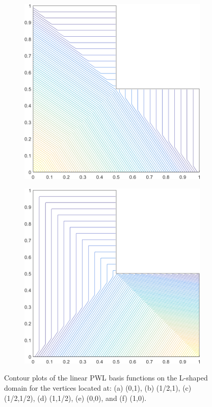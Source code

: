 \begin{figure}
\begin{subfigure}[b]{0.39\textwidth}
		\caption{}
	\end{subfigure}
	\vfill
	\begin{subfigure}[b]{0.39\textwidth}
		\centering
		\includegraphics[width=\textwidth]{figures/sec_BF/L-domain_PWLD1_contour_b1.png}
		\caption{}
	\end{subfigure}
	\hspace{1.5cm}
	\begin{subfigure}[b]{0.39\textwidth}
		\centering
		\includegraphics[width=\textwidth]{figures/sec_BF/L-domain_PWLD1_contour_b2.png}
		\caption{}
	\end{subfigure}
\caption{Contour plots of the linear PWL basis functions on the L-shaped domain for the vertices located at: (a) (0,1), (b) (1/2,1), (c) (1/2,1/2), (d) (1,1/2), (e) (0,0), and (f) (1,0).}
\end{figure}

